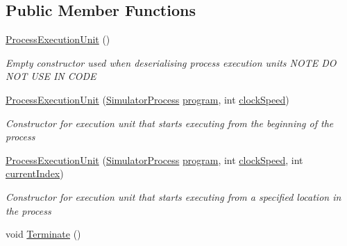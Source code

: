 \subsection*{Public Member Functions}
\begin{DoxyCompactItemize}
\item 
\hyperlink{class_c_p_u___o_s___simulator_1_1_operating___system_1_1_process_execution_unit_a071cfa1acfabcb2518376f67985e813f}{Process\+Execution\+Unit} ()
\begin{DoxyCompactList}\small\item\em Empty constructor used when deserialising process execution units N\+O\+T\+E D\+O N\+O\+T U\+S\+E I\+N C\+O\+D\+E \end{DoxyCompactList}\item 
\hyperlink{class_c_p_u___o_s___simulator_1_1_operating___system_1_1_process_execution_unit_a96760cbf88e3fb42a51253b6e961c609}{Process\+Execution\+Unit} (\hyperlink{class_c_p_u___o_s___simulator_1_1_operating___system_1_1_simulator_process}{Simulator\+Process} \hyperlink{class_c_p_u___o_s___simulator_1_1_c_p_u_1_1_execution_unit_a192670bee8ca089c38e9989350f658d6}{program}, int \hyperlink{class_c_p_u___o_s___simulator_1_1_c_p_u_1_1_execution_unit_a0deb0a3e0c9fa402598bbf18be6535cc}{clock\+Speed})
\begin{DoxyCompactList}\small\item\em Constructor for execution unit that starts executing from the beginning of the process \end{DoxyCompactList}\item 
\hyperlink{class_c_p_u___o_s___simulator_1_1_operating___system_1_1_process_execution_unit_a89783c451bba101568a4a9b0fe09df81}{Process\+Execution\+Unit} (\hyperlink{class_c_p_u___o_s___simulator_1_1_operating___system_1_1_simulator_process}{Simulator\+Process} \hyperlink{class_c_p_u___o_s___simulator_1_1_c_p_u_1_1_execution_unit_a192670bee8ca089c38e9989350f658d6}{program}, int \hyperlink{class_c_p_u___o_s___simulator_1_1_c_p_u_1_1_execution_unit_a0deb0a3e0c9fa402598bbf18be6535cc}{clock\+Speed}, int \hyperlink{class_c_p_u___o_s___simulator_1_1_c_p_u_1_1_execution_unit_af6807cb5343acc2c40a08166c748f1f0}{current\+Index})
\begin{DoxyCompactList}\small\item\em Constructor for execution unit that starts executing from a specified location in the process \end{DoxyCompactList}\item 
void \hyperlink{class_c_p_u___o_s___simulator_1_1_operating___system_1_1_process_execution_unit_a5685d8f35ca37a904236d8e96f3aabb1}{Terminate} ()
\end{DoxyCompactItemize}
